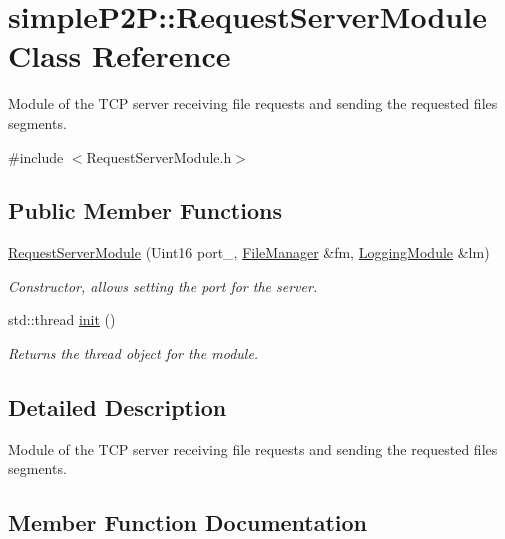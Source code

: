 \hypertarget{classsimpleP2P_1_1RequestServerModule}{}\section{simple\+P2P\+:\+:Request\+Server\+Module Class Reference}
\label{classsimpleP2P_1_1RequestServerModule}


Module of the T\+CP server receiving file requests and sending the requested files\textquotesingle{} segments.  




{\ttfamily \#include $<$Request\+Server\+Module.\+h$>$}

\subsection*{Public Member Functions}
\begin{DoxyCompactItemize}
\item 
\mbox{\label{classsimpleP2P_1_1RequestServerModule_a3dca7f496f8bd368ff68002c0224512b}} 
\hyperlink{classsimpleP2P_1_1RequestServerModule_a3dca7f496f8bd368ff68002c0224512b}{Request\+Server\+Module} (Uint16 port\+\_\+, \hyperlink{classsimpleP2P_1_1FileManager}{File\+Manager} \&fm, \hyperlink{classsimpleP2P_1_1LoggingModule}{Logging\+Module} \&lm)
\begin{DoxyCompactList}\small\item\em Constructor, allows setting the port for the server. \end{DoxyCompactList}\item 
std\+::thread \hyperlink{classsimpleP2P_1_1RequestServerModule_a3ab4c254bd55ff9800156118e1ff472e}{init} ()
\begin{DoxyCompactList}\small\item\em Returns the thread object for the module. \end{DoxyCompactList}\end{DoxyCompactItemize}


\subsection{Detailed Description}
Module of the T\+CP server receiving file requests and sending the requested files\textquotesingle{} segments. 

\subsection{Member Function Documentation}
\mbox{\label{classsimpleP2P_1_1RequestServerModule_a3ab4c254bd55ff9800156118e1ff472e}} 
